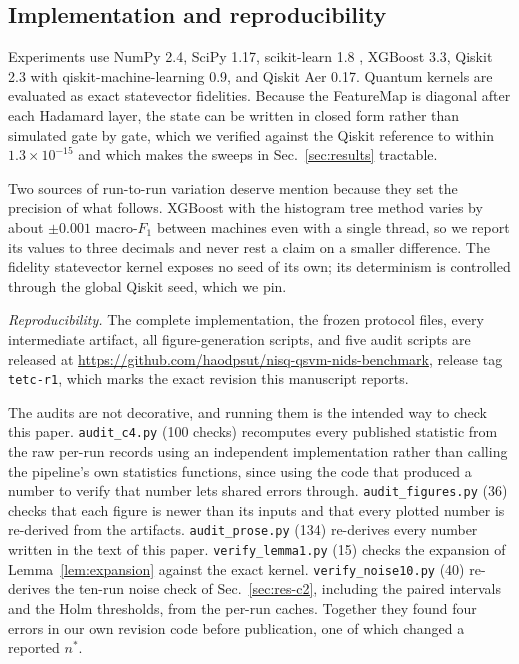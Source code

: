 \subsection{Implementation and reproducibility}
\begin{revbody}

Experiments use NumPy 2.4, SciPy 1.17, scikit-learn 1.8 \cite{ref30},
XGBoost 3.3, Qiskit 2.3 \cite{ref29} with qiskit-machine-learning 0.9, and
Qiskit Aer 0.17. Quantum
kernels are evaluated as exact statevector fidelities. Because the
\ZZ{}FeatureMap is diagonal after each Hadamard layer, the state can be written
in closed form rather than simulated gate by gate, which we verified against the
Qiskit reference to within $1.3\times10^{-15}$ and which makes the sweeps in
Sec.~\ref{sec:results} tractable.

Two sources of run-to-run variation deserve mention because they set the
precision of what follows. XGBoost with the histogram tree method varies by
about $\pm0.001$ macro-$F_1$ between machines even with a single thread, so we
report its values to three decimals and never rest a claim on a smaller
difference. The fidelity statevector kernel exposes no seed of its own; its
determinism is controlled through the global Qiskit seed, which we pin.

\emph{Reproducibility.} The complete implementation, the frozen protocol files,
every intermediate artifact, all figure-generation scripts, and five audit
scripts are released at
\url{https://github.com/haodpsut/nisq-qsvm-nids-benchmark}, release tag \texttt{tetc-r1}, which
marks the exact revision this manuscript reports.

The audits are not decorative, and running them is the intended way to check
this paper. \texttt{audit\_c4.py} (100 checks) recomputes every published
statistic from the raw per-run records using an independent implementation
rather than calling the pipeline's own statistics functions, since using the
code that produced a number to verify that number lets shared errors through.
\texttt{audit\_figures.py} (36) checks that each figure is newer than its inputs
and that every plotted number is re-derived from the artifacts.
\texttt{audit\_prose.py} (134) re-derives every number written in the text of
this paper. \texttt{verify\_lemma1.py} (15) checks the expansion of
Lemma~\ref{lem:expansion} against the exact kernel. \texttt{verify\_noise10.py} (40)
re-derives the ten-run noise check of Sec.~\ref{sec:res-c2}, including the
paired intervals and the Holm thresholds, from the per-run caches. Together they found four
errors in our own revision code before publication, one of which changed a
reported $n^{\ast}$.
\end{revbody}
